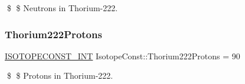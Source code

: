 \$ \$ Neutrons in Thorium-\/222. \mbox{\label{group___isotope_const-_thorium-_th222_ga959a6486b70bd3894c52354f434da0e7}} 
\subsubsection{\texorpdfstring{Thorium222\+Protons}{Thorium222Protons}}
{\footnotesize\ttfamily \mbox{\hyperlink{group___isotope_const-_macros_ga5f18360b3e99483a35c32d789e62621c}{I\+S\+O\+T\+O\+P\+E\+C\+O\+N\+S\+T\+\_\+\+I\+NT}} Isotope\+Const\+::\+Thorium222\+Protons = 90}

\$ \$ Protons in Thorium-\/222. 